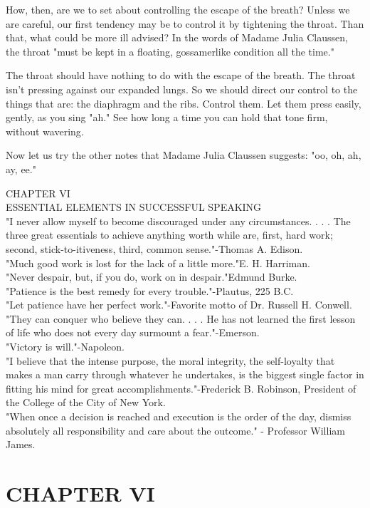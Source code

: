 \documentclass[10pt]{article}
\begin{document}
How, then, are we to set about controlling the escape of the breath? Unless we are careful, our first tendency may be to control it by tightening the throat. Than that, what could be more ill advised? In the words of Madame Julia Claussen, the throat "must be kept in a floating, gossamerlike condition all the time."

The throat should have nothing to do with the escape of the breath. The throat isn't pressing against our expanded lungs. So we should direct our control to the things that are: the diaphragm and the ribs. Control them. Let them press easily, gently, as you sing "ah." See how long a time you can hold that tone firm, without wavering.

Now let us try the other notes that Madame Julia Claussen suggests: "oo, oh, ah, ay, ee."

CHAPTER VI\\
ESSENTIAL ELEMENTS IN SUCCESSFUL SPEAKING\\
"I never allow myself to become discouraged under any circumstances. . . . The three great essentials to achieve anything worth while are, first, hard work; second, stick-to-itiveness, third, common sense."-Thomas A. Edison.\\
"Much good work is lost for the lack of a little more."E. H. Harriman.\\
"Never despair, but, if you do, work on in despair."Edmund Burke.\\
"Patience is the best remedy for every trouble."-Plautus, 225 B.C.\\
"Let patience have her perfect work."-Favorite motto of Dr. Russell H. Conwell.\\
"They can conquer who believe they can. . . . He has not learned the first lesson of life who does not every day surmount a fear."-Emerson.\\
"Victory is will."-Napoleon.\\
"I believe that the intense purpose, the moral integrity, the self-loyalty that makes a man carry through whatever he undertakes, is the biggest single factor in fitting his mind for great accomplishments."-Frederick B. Robinson, President of the College of the City of New York.\\
"When once a decision is reached and execution is the order of the day, dismiss absolutely all responsibility and care about the outcome." - Professor William James.

\section*{CHAPTER VI}
\end{document}
